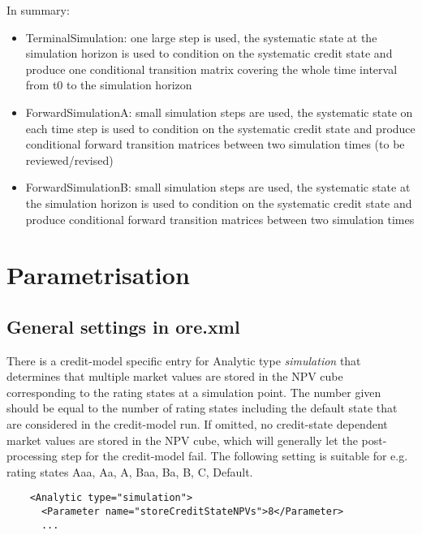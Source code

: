 \documentclass[12pt, a4paper]{article}
\begin{document}
In summary:
\begin{itemize}
\item TerminalSimulation: one large step is used, the systematic state at the simulation horizon is used to condition on the systematic credit state and produce one conditional transition matrix covering the whole time interval from t0 to the simulation horizon
\item ForwardSimulationA: small simulation steps are used, the systematic state on each time step is used to condition on the systematic credit state and produce conditional forward transition matrices between two simulation times (to be reviewed/revised)
\item ForwardSimulationB: small simulation steps are used, the systematic state at the simulation horizon is used to condition on the systematic credit state and produce conditional forward transition matrices between two simulation times
\end{itemize}


\section{Parametrisation}

\subsection{General settings in ore.xml}\label{general_settings}

There is a credit-model specific entry for Analytic type {\em simulation} that determines that multiple market values
are stored in the NPV cube corresponding to the rating states at a simulation point. The number given should be equal to
the number of rating states including the default state that are considered in the credit-model run. If omitted, no
credit-state dependent market values are stored in the NPV cube, which will generally let the post-processing step for
the credit-model fail. The following setting is suitable for e.g. rating states Aaa, Aa, A, Baa, Ba, B, C, Default.

\begin{verbatim}
    <Analytic type="simulation">
      <Parameter name="storeCreditStateNPVs">8</Parameter>
      ...
\end{verbatim}
\end{document}
